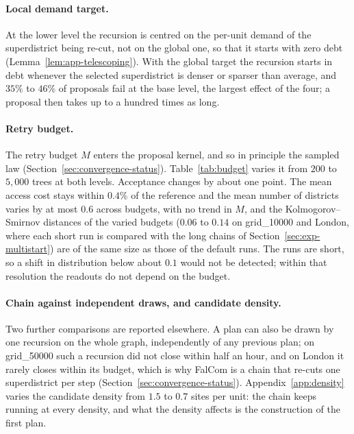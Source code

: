 \paragraph{Local demand target.}
At the lower level the recursion is centred on the per-unit demand of the superdistrict being re-cut, not on the global one, so that it starts with zero debt (Lemma~\ref{lem:app-telescoping}). With the global target the recursion starts in debt whenever the selected superdistrict is denser or sparser than average, and $35\%$ to $46\%$ of proposals fail at the base level, the largest effect of the four; a proposal then takes up to a hundred times as long.

\paragraph{Retry budget.}
The retry budget $M$ enters the proposal kernel, and so in principle the sampled law (Section~\ref{sec:convergence-status}). Table~\ref{tab:budget} varies it from $200$ to $5{,}000$ trees at both levels. Acceptance changes by about one point. The mean access cost stays within $0.4\%$ of the reference and the mean number of districts varies by at most $0.6$ across budgets, with no trend in $M$, and the Kolmogorov--Smirnov distances of the varied budgets ($0.06$ to $0.14$ on grid\_10000 and London, where each short run is compared with the long chains of Section~\ref{sec:exp-multistart}) are of the same size as those of the default runs. The runs are short, so a shift in distribution below about $0.1$ would not be detected; within that resolution the readouts do not depend on the budget.

\begin{table}[!htbp]
\centering
\small

\caption{Sensitivity to the retry budget $M$, two seeds per setting. Acceptance is the range over the seeds. For grid\_10000 and London the Kolmogorov--Smirnov distances are from each run to the long chains of Table~\ref{tab:multistart} (largest over the two seeds), and the mean access cost is relative to those chains; for grid\_1000 they are to the pooled default runs. Values in parentheses are the default setting, which gives the noise of the comparison.}
\label{tab:budget}
\end{table}

\paragraph{Chain against independent draws, and candidate density.}
Two further comparisons are reported elsewhere. A plan can also be drawn by one recursion on the whole graph, independently of any previous plan; on grid\_50000 such a recursion did not close within half an hour, and on London it rarely closes within its budget, which is why FalCom is a chain that re-cuts one superdistrict per step (Section~\ref{sec:convergence-status}). Appendix~\ref{app:density} varies the candidate density from $1.5$ to $0.7$ sites per unit: the chain keeps running at every density, and what the density affects is the construction of the first plan.



